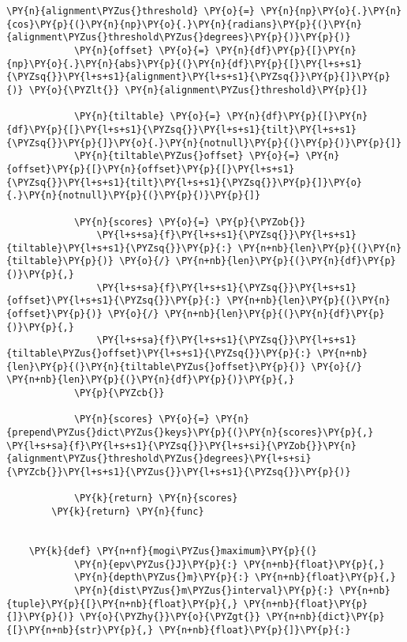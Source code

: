 \begin{tcolorbox}[breakable, size=fbox, boxrule=1pt, pad at break*=1mm,colback=cellbackground, colframe=cellborder]
\begin{Verbatim}[commandchars=\\\{\}]
            \PY{n}{alignment\PYZus{}threshold} \PY{o}{=} \PY{n}{np}\PY{o}{.}\PY{n}{cos}\PY{p}{(}\PY{n}{np}\PY{o}{.}\PY{n}{radians}\PY{p}{(}\PY{n}{alignment\PYZus{}threshold\PYZus{}degrees}\PY{p}{)}\PY{p}{)}
            \PY{n}{offset} \PY{o}{=} \PY{n}{df}\PY{p}{[}\PY{n}{np}\PY{o}{.}\PY{n}{abs}\PY{p}{(}\PY{n}{df}\PY{p}{[}\PY{l+s+s1}{\PYZsq{}}\PY{l+s+s1}{alignment}\PY{l+s+s1}{\PYZsq{}}\PY{p}{]}\PY{p}{)} \PY{o}{\PYZlt{}} \PY{n}{alignment\PYZus{}threshold}\PY{p}{]}
    
            \PY{n}{tiltable} \PY{o}{=} \PY{n}{df}\PY{p}{[}\PY{n}{df}\PY{p}{[}\PY{l+s+s1}{\PYZsq{}}\PY{l+s+s1}{tilt}\PY{l+s+s1}{\PYZsq{}}\PY{p}{]}\PY{o}{.}\PY{n}{notnull}\PY{p}{(}\PY{p}{)}\PY{p}{]}
            \PY{n}{tiltable\PYZus{}offset} \PY{o}{=} \PY{n}{offset}\PY{p}{[}\PY{n}{offset}\PY{p}{[}\PY{l+s+s1}{\PYZsq{}}\PY{l+s+s1}{tilt}\PY{l+s+s1}{\PYZsq{}}\PY{p}{]}\PY{o}{.}\PY{n}{notnull}\PY{p}{(}\PY{p}{)}\PY{p}{]}
    
            \PY{n}{scores} \PY{o}{=} \PY{p}{\PYZob{}}
                \PY{l+s+sa}{f}\PY{l+s+s1}{\PYZsq{}}\PY{l+s+s1}{tiltable}\PY{l+s+s1}{\PYZsq{}}\PY{p}{:} \PY{n+nb}{len}\PY{p}{(}\PY{n}{tiltable}\PY{p}{)} \PY{o}{/} \PY{n+nb}{len}\PY{p}{(}\PY{n}{df}\PY{p}{)}\PY{p}{,}
                \PY{l+s+sa}{f}\PY{l+s+s1}{\PYZsq{}}\PY{l+s+s1}{offset}\PY{l+s+s1}{\PYZsq{}}\PY{p}{:} \PY{n+nb}{len}\PY{p}{(}\PY{n}{offset}\PY{p}{)} \PY{o}{/} \PY{n+nb}{len}\PY{p}{(}\PY{n}{df}\PY{p}{)}\PY{p}{,}
                \PY{l+s+sa}{f}\PY{l+s+s1}{\PYZsq{}}\PY{l+s+s1}{tiltable\PYZus{}offset}\PY{l+s+s1}{\PYZsq{}}\PY{p}{:} \PY{n+nb}{len}\PY{p}{(}\PY{n}{tiltable\PYZus{}offset}\PY{p}{)} \PY{o}{/} \PY{n+nb}{len}\PY{p}{(}\PY{n}{df}\PY{p}{)}\PY{p}{,}
            \PY{p}{\PYZcb{}}
    
            \PY{n}{scores} \PY{o}{=} \PY{n}{prepend\PYZus{}dict\PYZus{}keys}\PY{p}{(}\PY{n}{scores}\PY{p}{,} \PY{l+s+sa}{f}\PY{l+s+s1}{\PYZsq{}}\PY{l+s+si}{\PYZob{}}\PY{n}{alignment\PYZus{}threshold\PYZus{}degrees}\PY{l+s+si}{\PYZcb{}}\PY{l+s+s1}{\PYZus{}}\PY{l+s+s1}{\PYZsq{}}\PY{p}{)}
    
            \PY{k}{return} \PY{n}{scores}
        \PY{k}{return} \PY{n}{func}
    
    
    \PY{k}{def} \PY{n+nf}{mogi\PYZus{}maximum}\PY{p}{(}
            \PY{n}{epv\PYZus{}J}\PY{p}{:} \PY{n+nb}{float}\PY{p}{,}
            \PY{n}{depth\PYZus{}m}\PY{p}{:} \PY{n+nb}{float}\PY{p}{,}
            \PY{n}{dist\PYZus{}m\PYZus{}interval}\PY{p}{:} \PY{n+nb}{tuple}\PY{p}{[}\PY{n+nb}{float}\PY{p}{,} \PY{n+nb}{float}\PY{p}{]}\PY{p}{)} \PY{o}{\PYZhy{}}\PY{o}{\PYZgt{}} \PY{n+nb}{dict}\PY{p}{[}\PY{n+nb}{str}\PY{p}{,} \PY{n+nb}{float}\PY{p}{]}\PY{p}{:}
    

\end{Verbatim}
\end{tcolorbox}
